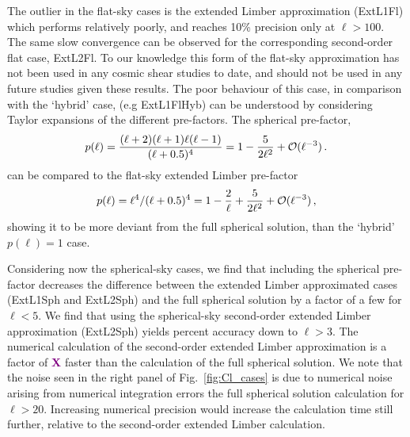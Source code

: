 \documentclass[fleqn,usenatbib]{mnras} %
\newcommand{\ch}[1]{\textcolor{purple}{\bf #1}}
\begin{document}
The outlier in the flat-sky cases is the extended Limber approximation (ExtL1Fl) which performs relatively poorly, and
reaches 10\% precision only at $\ell > 100$. The same slow convergence can be
observed for the corresponding second-order flat case, ExtL2Fl. To our knowledge this form of the flat-sky approximation has not been used in any cosmic shear studies to date, and should not be used in any future studies given these results.  The poor behaviour of this case, in comparison with the `hybrid' case, (e.g ExtL1FlHyb) can be understood by considering Taylor expansions of the different pre-factors.  The spherical pre-factor,
\begin{equation}
p(\ell) = \frac{(\ell+2)(\ell+1)\ell(\ell-1)}{(\ell + 0.5)^4} = 1-{5\over 2\ell^2} +{\cal O}(\ell^{-3}) \, .
\end{equation}
can be compared to the flat-sky extended Limber pre-factor
\begin{equation}
p(\ell) = \ell^4 / (\ell + 0.5)^4 = 1-{2\over \ell}+{5\over 2\ell^2} +{\cal O}(\ell^{-3}) \, , 
\end{equation} 
showing it to be more deviant from the full spherical solution, than the `hybrid' $p(\ell) = 1$ case. 

Considering now the spherical-sky cases, we find that including the spherical pre-factor decreases the difference between the extended Limber approximated cases (ExtL1Sph and ExtL2Sph) and the full spherical solution by a factor of a few for $\ell < 5$.   We find that using the spherical-sky second-order extended Limber approximation (ExtL2Sph) yields percent accuracy down to $\ell > 3$.  The numerical calculation of the second-order extended Limber approximation is a factor of \ch{X} faster than the calculation of the full spherical solution.   We note that the noise seen in the right panel of Fig.~\ref{fig:Cl_cases} is due to numerical noise arising from numerical integration errors the full spherical solution calculation for
$\ell > 20$.  Increasing numerical precision would increase the calculation time still further, relative to the  second-order extended Limber calculation.
\end{document}
